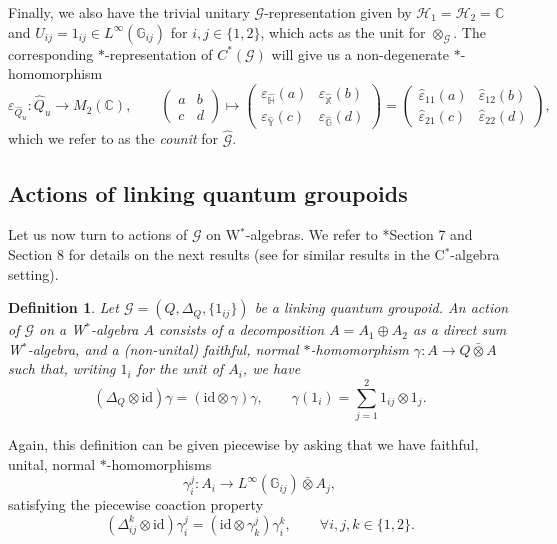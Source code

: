 \documentclass[reqno]{amsart}
\numberwithin{equation}{section}
\newtheorem{Def}[Theorem]{Definition}
\newcommand{\C}{\mathbb{C}}
\newcommand{\id}{\mathrm{id}}
\newcommand{\Hsp}{\mathcal{H}}
\newcommand{\G}{\mathbb{G}}
\newcommand{\Hh}{\mathbb{H}}
\newcommand{\X}{\mathbb{X}}
\newcommand{\Y}{\mathbb{Y}}
\newcommand{\msG}{\mathscr{G}}
\begin{document}
Finally, we also have the trivial unitary $\msG$-representation given by $\Hsp_1 = \Hsp_2 = \C$ and $U_{ij} = 1_{ij}\in L^{\infty}(\G_{ij})$ for $i,j\in \{1,2\}$, which acts as the unit for $\otimes_{\msG}$. The corresponding $*$-representation of $C^*(\msG)$ will give us a non-degenerate $*$-homomorphism 
\begin{equation}\label{EqUnivCounit}
\varepsilon_{\hat{Q}_u}\colon \hat{Q}_u \rightarrow M_2(\C),\qquad \begin{pmatrix} a & b \\ c & d\end{pmatrix} \mapsto \begin{pmatrix} \varepsilon_{\hat{\Hh}}(a) & \varepsilon_{\hat{\X}}(b) \\ \varepsilon_{\hat{\Y}}(c) & \varepsilon_{\hat{\G}}(d)\end{pmatrix} =  \begin{pmatrix} \hat{\varepsilon}_{11}(a) & \hat{\varepsilon}_{12}(b) \\ \hat{\varepsilon}_{21}(c) & \hat{\varepsilon}_{22}(d)\end{pmatrix},
\end{equation}
which we refer to as the \emph{counit} for $\hat{\msG}$.


\subsection{Actions of linking quantum groupoids}

Let us now turn to actions of $\msG$ on W$^*$-algebras. We refer to \cite{DC09}*{Section 7 and Section 8} for details on the next results (see \cite{Cre18} for similar results in the C$^*$-algebra setting).


\begin{Def}
Let $\msG = (Q,\Delta_Q,\{1_{ij}\})$ be a linking quantum groupoid. An \emph{action} of $\msG$ on a W$^*$-algebra $A$ consists of a decomposition $A = A_1\oplus A_2$ as a direct sum W$^*$-algebra, and a (non-unital) faithful, normal $*$-homomorphism $\gamma\colon A \rightarrow Q\bar{\otimes}A$ such that, writing $1_i$ for the unit of $A_i$, we have 
\[
(\Delta_Q\otimes \id)\gamma = (\id\otimes \gamma)\gamma,\qquad \gamma(1_i) = \sum_{j=1}^{2} 1_{ij} \otimes 1_j. 
\]
\end{Def} 
Again, this definition can be given piecewise by asking that we have faithful, unital, normal $*$-homomorphisms
\[
\gamma_i^j\colon A_i \rightarrow L^{\infty}(\G_{ij})\bar{\otimes} A_j, 
\]
satisfying the piecewise coaction property
\[
(\Delta_{ij}^k\otimes \id)\gamma_i^j = (\id\otimes \gamma_k^j)\gamma_i^k,\qquad \forall i,j,k\in \{1,2\}. 
\]
\end{document}
